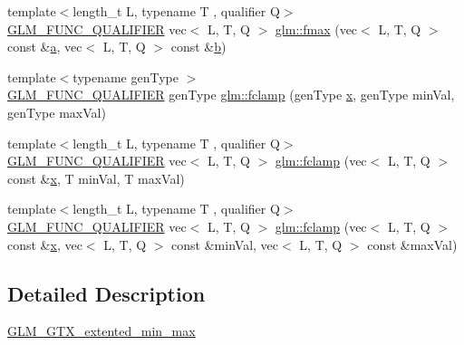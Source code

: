 \begin{DoxyCompactItemize}
\item 
{\footnotesize template$<$length\+\_\+t L, typename T , qualifier Q$>$ }\\\mbox{\hyperlink{setup_8hpp_a33fdea6f91c5f834105f7415e2a64407}{G\+L\+M\+\_\+\+F\+U\+N\+C\+\_\+\+Q\+U\+A\+L\+I\+F\+I\+ER}} vec$<$ L, T, Q $>$ \mbox{\hyperlink{group__gtx__extended__min__max_ga538c9e7de1d0cb8157e548691487d32a}{glm\+::fmax}} (vec$<$ L, T, Q $>$ const \&\mbox{\hyperlink{_s_d_l__opengl__glext_8h_a3309789fc188587d666cda5ece79cf82}{a}}, vec$<$ L, T, Q $>$ const \&\mbox{\hyperlink{_s_d_l__opengl__glext_8h_a0f71581a41fd2264c8944126dabbd010}{b}})
\item 
{\footnotesize template$<$typename gen\+Type $>$ }\\\mbox{\hyperlink{setup_8hpp_a33fdea6f91c5f834105f7415e2a64407}{G\+L\+M\+\_\+\+F\+U\+N\+C\+\_\+\+Q\+U\+A\+L\+I\+F\+I\+ER}} gen\+Type \mbox{\hyperlink{group__gtx__extended__min__max_ga1e28539d3a46965ed9ef92ec7cb3b18a}{glm\+::fclamp}} (gen\+Type \mbox{\hyperlink{_s_d_l__opengl_8h_ad0e63d0edcdbd3d79554076bf309fd47}{x}}, gen\+Type min\+Val, gen\+Type max\+Val)
\item 
{\footnotesize template$<$length\+\_\+t L, typename T , qualifier Q$>$ }\\\mbox{\hyperlink{setup_8hpp_a33fdea6f91c5f834105f7415e2a64407}{G\+L\+M\+\_\+\+F\+U\+N\+C\+\_\+\+Q\+U\+A\+L\+I\+F\+I\+ER}} vec$<$ L, T, Q $>$ \mbox{\hyperlink{group__gtx__extended__min__max_ga60796d08903489ee185373593bc16b9d}{glm\+::fclamp}} (vec$<$ L, T, Q $>$ const \&\mbox{\hyperlink{_s_d_l__opengl_8h_ad0e63d0edcdbd3d79554076bf309fd47}{x}}, T min\+Val, T max\+Val)
\item 
{\footnotesize template$<$length\+\_\+t L, typename T , qualifier Q$>$ }\\\mbox{\hyperlink{setup_8hpp_a33fdea6f91c5f834105f7415e2a64407}{G\+L\+M\+\_\+\+F\+U\+N\+C\+\_\+\+Q\+U\+A\+L\+I\+F\+I\+ER}} vec$<$ L, T, Q $>$ \mbox{\hyperlink{group__gtx__extended__min__max_ga5c15fa4709763c269c86c0b8b3aa2297}{glm\+::fclamp}} (vec$<$ L, T, Q $>$ const \&\mbox{\hyperlink{_s_d_l__opengl_8h_ad0e63d0edcdbd3d79554076bf309fd47}{x}}, vec$<$ L, T, Q $>$ const \&min\+Val, vec$<$ L, T, Q $>$ const \&max\+Val)
\end{DoxyCompactItemize}


\subsection{Detailed Description}
\mbox{\hyperlink{group__gtx__extended__min__max}{G\+L\+M\+\_\+\+G\+T\+X\+\_\+extented\+\_\+min\+\_\+max}} 